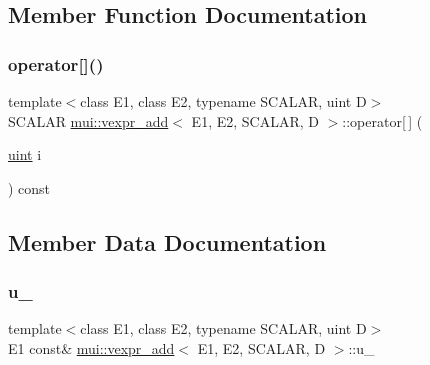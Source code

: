 \subsection{Member Function Documentation}
\mbox{\label{structmui_1_1vexpr__add_a9e6b72fecc4b5dc3d5b985bf772bbcf5}} 
\subsubsection{\texorpdfstring{operator[]()}{operator[]()}}
{\footnotesize\ttfamily template$<$class E1, class E2, typename S\+C\+A\+L\+AR, uint D$>$ \\
S\+C\+A\+L\+AR \hyperlink{structmui_1_1vexpr__add}{mui\+::vexpr\+\_\+add}$<$ E1, E2, S\+C\+A\+L\+AR, D $>$\+::operator\mbox{[}$\,$\mbox{]} (\begin{DoxyParamCaption}\item[{\hyperlink{namespacemui_af15a3e7188a2117fb9965277bb0cacd2}{uint}}]{i }\end{DoxyParamCaption}) const\hspace{0.3cm}{\ttfamily [inline]}}



\subsection{Member Data Documentation}
\mbox{\label{structmui_1_1vexpr__add_aacc5ddf4b6997a5e395865677d14e4d8}} 
\subsubsection{\texorpdfstring{u\+\_\+}{u\_}}
{\footnotesize\ttfamily template$<$class E1, class E2, typename S\+C\+A\+L\+AR, uint D$>$ \\
E1 const\& \hyperlink{structmui_1_1vexpr__add}{mui\+::vexpr\+\_\+add}$<$ E1, E2, S\+C\+A\+L\+AR, D $>$\+::u\+\_\+\hspace{0.3cm}{\ttfamily [protected]}}

\mbox{\label{structmui_1_1vexpr__add_aaaab45c08aabf1d92dc4aee8cec469a4}} 
